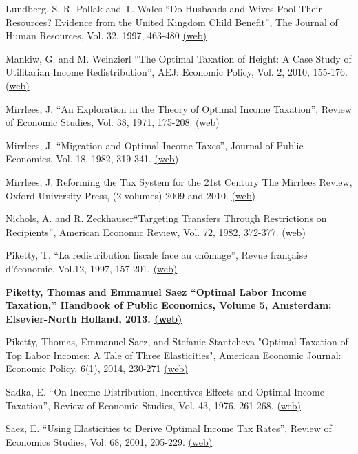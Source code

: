 \documentclass[landscape]{slides}
\begin{document}
\begin{slide}
{Lundberg, S. R. Pollak and T. Wales ``Do Husbands and Wives Pool Their Resources? Evidence from the United Kingdom Child Benefit'', The Journal of Human Resources, Vol. 32, 1997, 463-480 \href{http://www.jstor.org/stable/pdfplus/146179.pdf} {(web)}

Mankiw, G. and M. Weinzierl ``The Optimal Taxation of Height: A Case Study of Utilitarian Income Redistribution'', AEJ: Economic Policy, Vol. 2, 2010, 155-176. \href{http://elsa.berkeley.edu/~saez/course/Mankiw and Weinzierl_AEJ(2010).pdf} {(web)}

Mirrlees, J. ``An Exploration in the Theory of Optimal Income Taxation'', Review of Economic Studies, Vol. 38, 1971, 175-208. \href{http://links.jstor.org/stable/pdfplus/2296779.pdf} {(web)}

Mirrlees, J. ``Migration and Optimal Income Taxes'', Journal of Public Economics, Vol. 18, 1982, 319-341. \href{http://elsa.berkeley.edu/~saez/course/Mirrlees_JPubE(1982).pdf} {(web)}

Mirrlees, J. Reforming the Tax System for the 21st Century The Mirrlees Review, Oxford University Press, (2 volumes) 2009 and 2010.
\href{http://www.ifs.org.uk/mirrleesReview} {(web)}

Nichols, A. and R. Zeckhauser``Targeting Transfers Through Restrictions on Recipients'', American Economic Review, Vol. 72, 1982, 372-377.  \href{http://links.jstor.org/stable/pdfplus/1802361.pdf} {(web)}

Piketty, T. ``La redistribution fiscale face au ch\^{o}mage'', Revue fran\c{c}aise d'\'{e}conomie, Vol.12, 1997, 157-201. \href{http://elsa.berkeley.edu/~saez/course/Piketty(1997).pdf} {(web)}

\textbf{Piketty, Thomas and Emmanuel Saez ``Optimal Labor Income Taxation,'' Handbook of Public Economics, Volume 5, Amsterdam: Elsevier-North Holland, 2013.
\href{http://www.nber.org/papers/w18521.pdf} {(web)} }

Piketty, Thomas, Emmanuel Saez, and Stefanie Stantcheva "Optimal Taxation of Top Labor Incomes: A Tale of Three Elasticities", American Economic Journal: Economic Policy, 6(1), 2014, 230-271
\href{http://eml.berkeley.edu/~saez/piketty-saez-stantchevaAEJ14.pdf} {(web)} 

Sadka, E. ``On Income Distribution, Incentives Effects and Optimal Income Taxation'', Review of Economic Studies, Vol. 43, 1976, 261-268. \href{http://www.jstor.org/stable/pdfplus/2297322.pdf} {(web)}

Saez, E. ``Using Elasticities to Derive Optimal Income Tax Rates'', Review of Economics Studies, Vol. 68, 2001, 205-229. \href{http://links.jstor.org/stable/pdfplus/2695925.pdf} {(web)} 

}
\end{slide}
\end{document}
